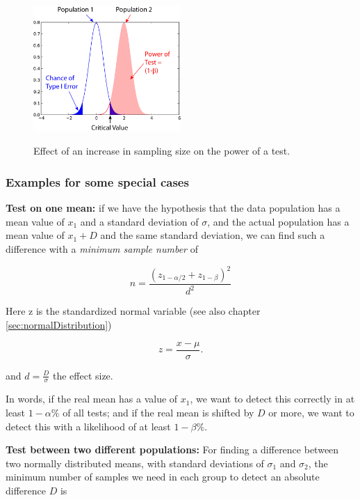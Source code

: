 \begin{figure}[!ht]
  \centering
  \includegraphics[width=0.5\textwidth]{../Images/power2.png}\\
  \caption{Effect of an increase in sampling size on the power of a test.}\label{fig:power2}
\end{figure}

\subsubsection{Examples for some special cases}

\textbf{Test on one mean:} if we have the hypothesis that the data population has a mean value of $x_1$ and a standard deviation of $\sigma$, and the actual population has a mean value of $x_1+D$ and the same standard deviation, we can find such a difference with a \emph{minimum sample number} of

\begin{equation}
  n = \frac{{({z_{1 - \alpha /2}} + {z_{1 - \beta }})}^2}{d^2}
\end{equation}

Here z is the standardized normal variable (see also chapter \ref{sec:normalDistribution})

\begin{equation}
  z = \frac{x-\mu}{\sigma} .
\end{equation}

and $d = \frac{D}{\sigma}$ the effect size.

In words, if the real mean has a value of $x_1$, we want to detect this correctly in at least $1-\alpha\%$ of all tests; and if the real mean is shifted by $D$ or more, we want to detect this with a likelihood of at least $1-\beta\%$.

\textbf{Test between two different populations:}
For finding a difference between two normally distributed means, with standard deviations of $\sigma_1$ and $\sigma_2$, the minimum number of samples we need in each group to detect an absolute difference $D$ is

